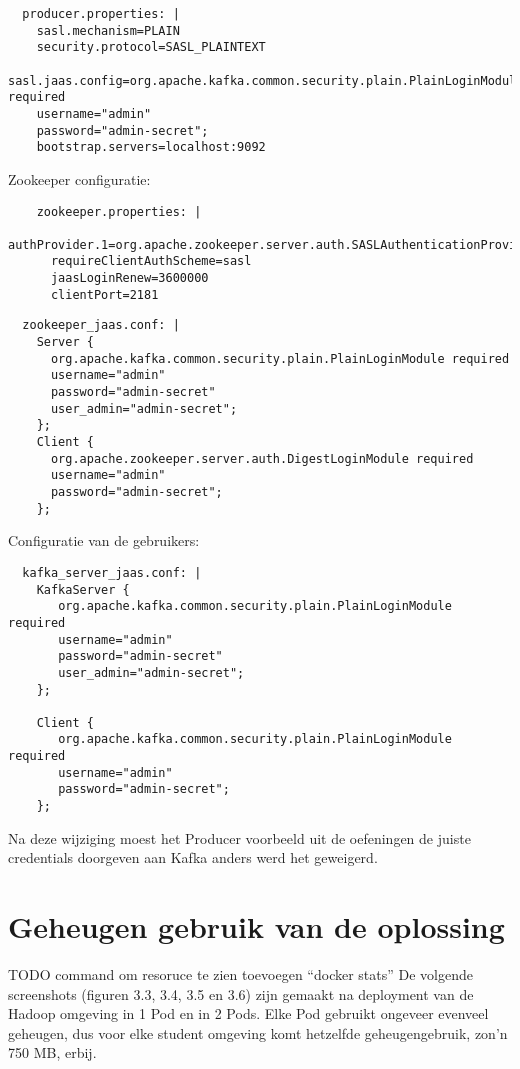 \begin{lstlisting}
  producer.properties: |
    sasl.mechanism=PLAIN
    security.protocol=SASL_PLAINTEXT
    sasl.jaas.config=org.apache.kafka.common.security.plain.PlainLoginModule required
    username="admin"
    password="admin-secret";
    bootstrap.servers=localhost:9092
\end{lstlisting}

Zookeeper configuratie:
\begin{lstlisting}
    zookeeper.properties: |
      authProvider.1=org.apache.zookeeper.server.auth.SASLAuthenticationProvider
      requireClientAuthScheme=sasl
      jaasLoginRenew=3600000
      clientPort=2181
\end{lstlisting}
  
\begin{lstlisting}
  zookeeper_jaas.conf: |
    Server {
      org.apache.kafka.common.security.plain.PlainLoginModule required
      username="admin"
      password="admin-secret"
      user_admin="admin-secret";
    };
    Client {
      org.apache.zookeeper.server.auth.DigestLoginModule required
      username="admin"
      password="admin-secret";
    };
\end{lstlisting}

Configuratie van de gebruikers:
\begin{lstlisting}
  kafka_server_jaas.conf: |
    KafkaServer {
       org.apache.kafka.common.security.plain.PlainLoginModule required
       username="admin"
       password="admin-secret"
       user_admin="admin-secret";
    };

    Client {
       org.apache.kafka.common.security.plain.PlainLoginModule required
       username="admin"
       password="admin-secret";
    };
\end{lstlisting}

Na deze wijziging moest het Producer voorbeeld uit de oefeningen de juiste credentials doorgeven aan Kafka anders werd het geweigerd.

\section{Geheugen gebruik van de oplossing} TODO command om resoruce te zien toevoegen ``docker stats''
De volgende screenshots (figuren 3.3, 3.4, 3.5 en 3.6) zijn gemaakt na deployment van de Hadoop omgeving in 1 Pod en in 2 Pods. Elke Pod gebruikt ongeveer evenveel geheugen, dus voor elke student omgeving komt hetzelfde geheugengebruik, zon'n 750 MB, erbij.

